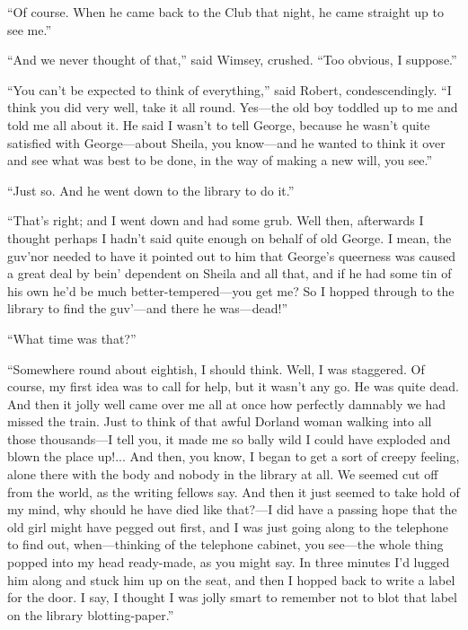 \enquote{Of course. When he came back to the Club that night, he came straight up to see me.}

\enquote{And we never thought of that,} said Wimsey, crushed. \enquote{Too obvious, I suppose.}

\enquote{You can't be expected to think of everything,} said Robert, condescendingly. \enquote{I think you did very well, take it all round. Yes\allowbreak---\allowbreak the old boy toddled up to me and told me all about it. He said I wasn't to tell George, because he wasn't quite satisfied with George\allowbreak---\allowbreak about Sheila, you know\allowbreak---\allowbreak and he wanted to think it over and see what was best to be done, in the way of making a new will, you see.}

\enquote{Just so. And he went down to the library to do it.}

\enquote{That's right; and I went down and had some grub. Well then, afterwards I thought perhaps I hadn't said quite enough on behalf of old George. I mean, the guv'nor needed to have it pointed out to him that George's queerness was caused a great deal by bein' dependent on Sheila and all that, and if he had some tin of his own he'd be much better-tempered\allowbreak---\allowbreak you get me? So I hopped through to the library to find the guv'---and there he was\allowbreak---\allowbreak dead!}

\enquote{What time was that?}

\enquote{Somewhere round about eightish, I should think. Well, I was staggered. Of course, my first idea was to call for help, but it wasn't any go. He was quite dead. And then it jolly well came over me all at once how perfectly damnably we had missed the train. Just to think of that awful Dorland woman walking into all those thousands\allowbreak---\allowbreak I tell you, it made me so bally wild I could have exploded and blown the place up!... And then, you know, I began to get a sort of creepy feeling, alone there with the body and nobody in the library at all. We seemed cut off from the world, as the writing fellows say. And then it just seemed to take hold of my mind, why should he have died like that?---I did have a passing hope that the old girl might have pegged out first, and I was just going along to the telephone to find out, when\allowbreak---\allowbreak thinking of the telephone cabinet, you see\allowbreak---\allowbreak the whole thing popped into my head ready-made, as you might say. In three minutes I'd lugged him along and stuck him up on the seat, and then I hopped back to write a label for the door. I say, I thought I was jolly smart to remember not to blot that label on the library blotting-paper.}

